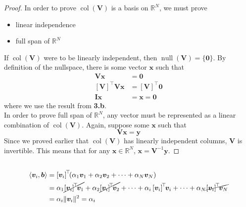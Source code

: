 \documentclass[]{article}
\newcommand{\iprod}[2]{\left\langle #1, #2 \right\rangle}
\newcommand{\tpose}[1]{\left[#1\right]^{\! \top} \!\!}
\begin{document}
\begin{proof}
In order to prove \(\operatorname{col}(\bm{V})\) is a basis on \(\mathbb{R}^N\), we must prove
\begin{itemize}
	\item linear independence
	\item full span of \(\mathbb{R}^N\)
\end{itemize}
If \(\operatorname{col}(\bm{V})\) were to be linearly independent, then \(\operatorname{null}(\bm{V}) = \{\bm{0}\}\). 
By definition of the nullspace, there is some vector \(\bm{x}\) such that 
\begin{align}
	\bm{V} \bm{x} &= \bm{0} \\
	\tpose{\bm{V}} \bm{V} \bm{x} &= \tpose{\bm{V}} \bm{0} \\
	\bm{I} \bm{x} &= \bm{x} = \bm{0}
\end{align}
where we use the result from \textbf{3.b}. \\
In order to prove full span of \(\mathbb{R}^N\), any vector must be represented as a linear combination of \(\operatorname{col}(\bm{V})\). 
Again, suppose some \(\bm{x}\) such that 
\begin{equation}
	\bm{V} \bm{x} = \bm{y}
\end{equation}
Since we proved earlier that \(\operatorname{col}(\bm{V})\) has linearly independent columns, \(\bm{V}\) is invertible. This means that for any \(\bm{x} \in \mathbb{R}^N\), \(\bm{x} = \bm{V}^{-1} \bm{y}\). 
\end{proof}

\subsection{}

\begin{align}
	\iprod{\bm{v}_i}{\bm{b}} &= \tpose{\bm{v}_i} (\alpha_1 \bm{v}_1 + \alpha_2 \bm{v}_2 + \cdots + \alpha_N \bm{v}_N) \\
	&= \alpha_1 \cancel{\tpose{\bm{v}_i} \bm{v}_1} + \alpha_2 \cancel{\tpose{\bm{v}_i} \bm{v}_2} + \cdots + \alpha_i \tpose{\bm{v}_i} \bm{v}_i + \cdots + \alpha_N \cancel{\tpose{\bm{v}_i} \bm{v}_N} \\
	&= \alpha_i \|\bm{v}_i\|^2 = \alpha_i
\end{align}

\subsection{}
\end{document}
